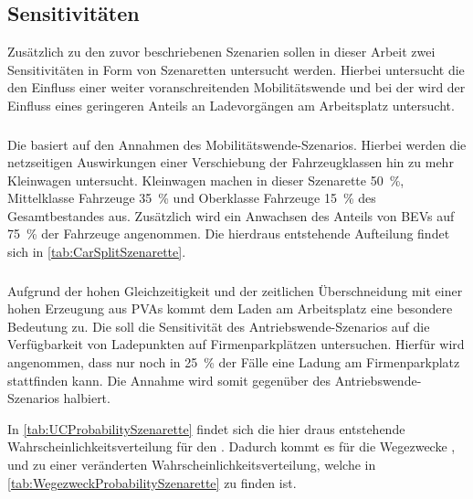 

\subsection{Sensitivitäten}

Zusätzlich zu den zuvor beschriebenen Szenarien sollen in dieser Arbeit zwei Sensitivitäten in Form von Szenaretten untersucht werden.
Hierbei untersucht die \Kleinwagen den Einfluss einer weiter voranschreitenden Mobilitätswende und bei der \SzeFirmenparkplatz wird der Einfluss eines geringeren Anteils an Ladevorgängen am Arbeitsplatz untersucht.

\subsubsection{\Kleinwagendot}

Die \Kleinwagen basiert auf den Annahmen des Mobilitätswende-Szenarios.
Hierbei werden die netzseitigen Auswirkungen einer Verschiebung der Fahrzeugklassen hin zu mehr Kleinwagen untersucht.
Kleinwagen machen in dieser Szenarette \SI{50}{\percent}, Mittelklasse Fahrzeuge \SI{35}{\percent} und Oberklasse Fahrzeuge \SI{15}{\percent} des Gesamtbestandes aus.
Zusätzlich wird ein Anwachsen des Anteils von \glspl{BEV} auf \SI{75}{\percent} der Fahrzeuge angenommen.
Die hierdraus entstehende Aufteilung findet sich in \autoref{tab:CarSplitSzenarette}.



\subsubsection{\SzeFirmenparkplatzdot}

Aufgrund der hohen Gleichzeitigkeit und der zeitlichen Überschneidung mit einer hohen Erzeugung aus \glspl{PVA} kommt dem Laden am Arbeitsplatz eine besondere Bedeutung zu.
Die \SzeFirmenparkplatz soll die Sensitivität des Antriebswende-Szenarios auf die Verfügbarkeit von Ladepunkten auf Firmenparkplätzen untersuchen.
Hierfür wird angenommen, dass nur noch in \SI{25}{\percent} der Fälle eine Ladung am Firmenparkplatz stattfinden kann.
Die Annahme wird somit gegenüber des Antriebswende-Szenarios halbiert.



In \autoref{tab:UCProbabilitySzenarette} findet sich die hier draus entstehende Wahrscheinlichkeitsverteilung für den \UC \Firmeparkplatzdot.
Dadurch kommt es für die Wegezwecke \Arbeitdot, \dienst und \Ausbildung zu einer veränderten Wahrscheinlichkeitsverteilung, welche in \autoref{tab:WegezweckProbabilitySzenarette} zu finden ist.

